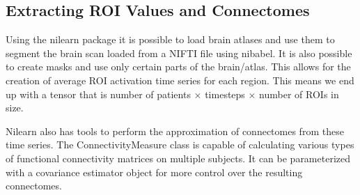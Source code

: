 	
	\subsection{Extracting ROI Values and Connectomes}
	\label{sec:extract}
	
	Using the nilearn package it is possible to load brain atlases and use them to segment the brain scan loaded from a NIFTI file using nibabel. It is also possible to create masks and use only certain parts of the brain/atlas. This allows for the creation of average ROI activation time series for each region. This means we end up with a tensor that is number of patients $\times$ timesteps $\times$ number of ROIs in size.
	
	Nilearn also has tools to perform the approximation of connectomes from these time series. The ConnectivityMeasure class is capable of calculating various types of functional connectivity matrices on multiple subjects. It can be parameterized with a covariance estimator object for more control over the resulting connectomes.
	